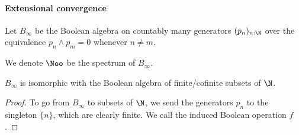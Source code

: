 \paragraph{Extensional convergence }  
\begin{definition}
  Let $B_\infty$ be the Boolean algebra on countably many generators $(p_n)_{n:\N}$ 
  over the equivalence $p_n\wedge p_m = 0 $ whenever $n \neq m$. 
\end{definition} 
\begin{definition}
  We denote $\Noo$ be the spectrum of $B_\infty$. 
\end{definition} 
\begin{lemma}
  $B_\infty$ is isomorphic with the Boolean algebra of 
  finite/cofinite subsets of $\N$. 
\end{lemma}
\begin{proof}
  To go from $B_\infty$ to subsets of $\N$, we send
  the generators $p_n$ to the singleton $\{n\}$, which are clearly finite. 
  We call the induced Boolean operation $f$. 


\end{proof}
